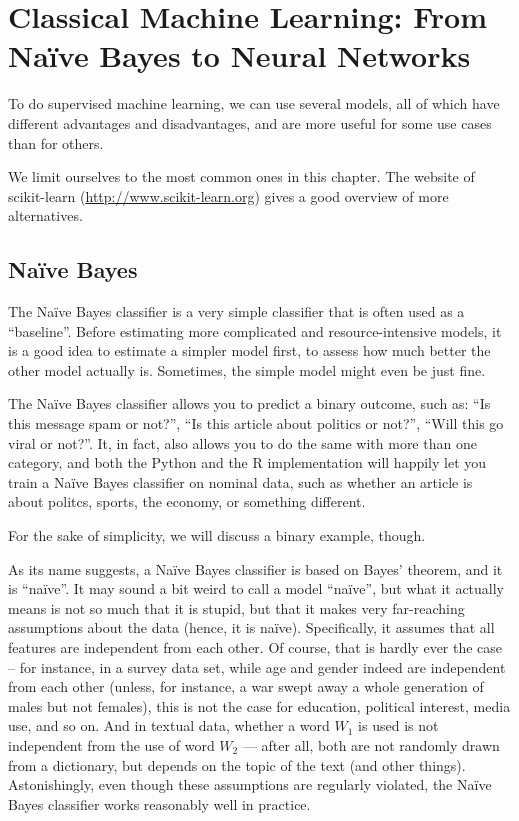 \section{Classical Machine Learning: From Na\"{i}ve Bayes to Neural Networks}
\label{sec:nb2dnn}
To do supervised machine learning, we can use several models, all of
which have different advantages and disadvantages, and are more useful
for some use cases than for others.

We limit ourselves to the most common ones in this chapter. The
website of scikit-learn (\url{http://www.scikit-learn.org}) gives a
good overview of more alternatives.

\subsection{Na\"ive Bayes}
\label{subsec:Na\"ive Bayes}

The Na\"ive Bayes classifier is a very simple classifier that is often
used as a ``baseline''. Before estimating more complicated and
resource-intensive models, it is a good idea to estimate a simpler
model first, to assess how much better the other model actually
is. Sometimes, the simple model might even be just fine.

The Na\"ive Bayes classifier allows you to predict a binary outcome,
such as: ``Is this message spam or not?'', ``Is this article about
politics or not?'', ``Will this go viral or not?''.  It, in fact, also
allows you to do the same with more than one category, and both the
Python and the R implementation will happily let you train a Na\"ive
Bayes classifier on nominal data, such as whether an article is about
politcs, sports, the economy, or something different.

For the sake of simplicity, we will discuss a binary example, though.

As its name suggests, a Na\"ive Bayes classifier is based on Bayes'
theorem, and it is ``na\"ive''.  It may sound a bit weird to call a
model ``na\"ive'', but what it actually means is not so much that it
is stupid, but that it makes very far-reaching assumptions about the
data (hence, it is na\"ive). Specifically, it assumes that all
features are independent from each other.  Of course, that is hardly
ever the case -- for instance, in a survey data set, while age and
gender indeed are independent from each other (unless, for
instance, a war swept away a whole generation of males but not
females), this is not the case for education, political interest,
media use, and so on.  And in textual data, whether a word $W_1$ is used
is not independent from the use of word $W_2$ --- after all, both are not
randomly drawn from a dictionary, but depends on the topic of the text
(and other things).  Astonishingly, even though these assumptions are
regularly violated, the Na\"ive Bayes classifier works reasonably well
in practice.


